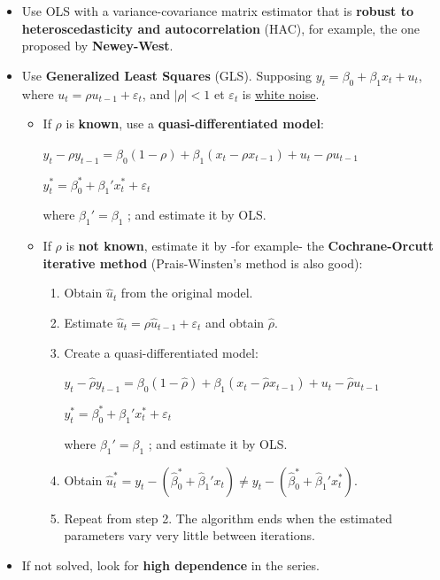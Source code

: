 \begin{f}[Correction]

\begin{itemize}[leftmargin=*]
\item Use OLS with a variance-covariance matrix estimator that is \textbf{robust to heteroscedasticity and autocorrelation} (HAC), for example, the one proposed by \textbf{Newey-West}.
\item Use \textbf{Generalized Least Squares} (GLS). Supposing \(y_{t} = \beta_{0} + \beta_{1} x_{t} + u_{t}\), where \(u_{t} = \rho u_{t - 1}+ \varepsilon_{t}\), and \(\lvert \rho \rvert < 1\) et \(\varepsilon_{t}\) is \underline{white noise}.

\begin{itemize}[leftmargin=*]
\item If \(\rho\) is \textbf{known}, use a \textbf{quasi-differentiated model}:

\begin{center}
	\(y_{t} - \rho y_{t - 1}= \beta_{0} (1 - \rho) + \beta_{1} (x_{t} - \rho x_{t - 1}) + u_{t} - \rho u_{t - 1}\)
	
	\(y_{t}^{*} = \beta_{0}^{*} + \beta_{1}' x_{t}^{*} + \varepsilon_{t}\)
\end{center}

where \(\beta_{1}' = \beta_{1}\) ; and estimate it by OLS.

\item If \(\rho\) is \textbf{not known}, estimate it by -for example- the \textbf{Cochrane-Orcutt iterative method} (Prais-Winsten's method is also good):

\begin{enumerate}[leftmargin=*]
	\item Obtain \(\hat{u}_{t}\) from the original model.
	\item Estimate \(\hat{u}_{t} = \rho \hat{u}_{t-1} + \varepsilon_{t}\) and obtain \(\hat{\rho}\).
	\item Create a quasi-differentiated model:
	
	\begin{center}
		\(y_{t} - \hat{\rho}y_{t - 1} = \beta_{0} (1 - \hat{\rho}) + \beta_{1} (x_{t} - \hat{\rho} x_{t - 1}) + u_{t} - \hat{\rho}u_{t - 1}\)
		
		\(y_{t}^{*} = \beta_{0}^{*} + \beta_{1}' x_{t}^{*} + \varepsilon_{t}\)
	\end{center}
	
	where \(\beta_{1}' = \beta_{1}\) ; and estimate it by OLS.
	
	\item Obtain \(\hat{u}_{t}^{*} = y_{t} - (\hat{\beta}_{0}^{*} + \hat{\beta}_{1}' x_{t}) \neq y_ {t} - (\hat{\beta}_{0}^{*} + \hat{\beta}_{1}' x_{t}^{*})\).
	\item Repeat from step 2. The algorithm ends when the estimated parameters vary very little between iterations.
\end{enumerate}
\end{itemize}

\item If not solved, look for \textbf{high dependence} in the series.
\end{itemize}

\end{f}  
